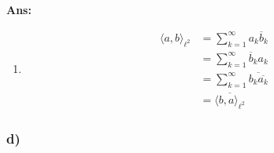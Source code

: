 \documentclass[11pt]{article}
\newenvironment{solbox}
  {\begin{mdframed}[linewidth=1pt,linecolor=black,roundcorner=5pt]
   \noindent\textbf{Ans: }\enspace}
  {\end{mdframed}}
\begin{document}
\begin{solbox}
\begin{enumerate}
        \item \begin{align*}
            \langle a, b \rangle_{ \ell^2 } &= \sum_{ k=1 }^{ \infty } a_k \overline{b}_k \\
            &= \sum_{ k=1 }^{ \infty } \overline{b}_k a_k \\
            &= \sum_{ k=1 }^{ \infty } \overline{b_k \overline{a_k}}\\
            &= \overline{ \langle b, a \rangle_{ \ell^2 } }
        \end{align*}
        
    \end{enumerate}


    


\end{solbox}


\subsubsection{d)}
\end{document}
